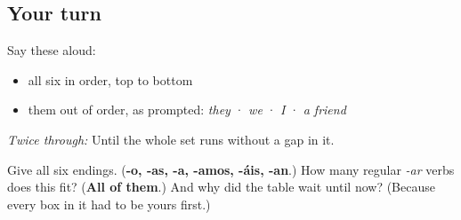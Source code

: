 \subsection*{Your turn}
Say these aloud:

\begin{itemize}
\raggedright
  \item all six in order, top to bottom
  \item them out of order, as prompted: \emph{they} · \emph{we} · \emph{I} · \emph{a friend}
\end{itemize}

\emph{Twice through:} Until the whole set runs without a gap in it.

\begin{tcolorbox}[breakable,colback=teal!4,colframe=teal!35!black,title={Before you move on}]
Give all six endings. (\textbf{-o, -as, -a, -amos, -áis, -an}.) How many regular \emph{-ar} verbs does this fit? (\textbf{All of them}.) And why did the table wait until now? (Because every box in it had to be yours first.)
\end{tcolorbox}
